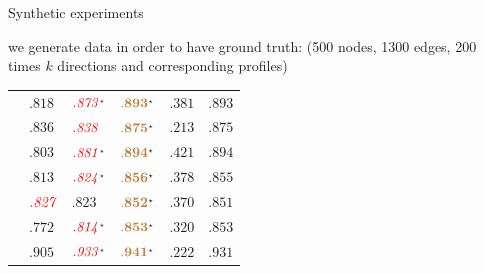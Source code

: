 \documentclass[10pt,svgnames,ignorenonframetext,final]{beamer}
\providecommand{\tightlist}{%
  \setlength{\itemsep}{0pt}\setlength{\parskip}{0pt}}
\begin{document}
\begin{frame}{Synthetic experiments}
\protect\hypertarget{synthetic-experiments}{}

  we generate data in order to have ground truth: (500 nodes, 1300 edges, 200 times $k$ directions
  and corresponding profiles)

  \begin{tabulary}{\textwidth}{llll|ll}
    \toprule
     & \thead{\kmeans{}} & \thead{\lloyd{}}                      &
    \thead{\combined{}}                  &  & \thead{\pqt{}} \\
    \midrule
    {}            & $.818 $           & $\esecondSig{.873 }\spval{1.25}{-63}$ & $\efirstSig{.893 }\spval{5.68}{-33}$ & $.381 $                      & $.893 $        \\
    {\smallk{}}             & $.836 $           & $\esecond{.838 }$                     & $\efirstSig{.875 }\spval{2.17}{-58}$ & $.213 $                      & $.875 $        \\
    {\largek{}}             & $.803 $           & $\esecondSig{.881 }\spval{2.66}{-94}$ & $\efirstSig{.894 }\spval{8.98}{-17}$ & $.421 $                      & $.894 $        \\
    {\smallo{}}             & $.813 $           & $\esecondSig{.824 }\spval{7.57}{-6}$  & $\efirstSig{.856 }\spval{2.99}{-57}$ & $.378 $                      & $.855 $        \\
    {\largeo{}}             & $\esecond{.827 }$ & $.823 $                               & $\efirstSig{.852 }\spval{1.90}{-25}$ & $.370 $                      & $.851 $        \\
    {\fdirs{}}              & $.772 $           & $\esecondSig{.814 }\spval{6.02}{-42}$ & $\efirstSig{.853 }\spval{2.13}{-47}$ & $.320 $                      & $.853 $        \\
    {\larged{}}             & $.905 $           & $\esecondSig{.933 }\spval{1.32}{-31}$ & $\efirstSig{.941 }\spval{1.77}{-22}$ & $.222 $                      & $.931 $        \\
    \bottomrule
  \end{tabulary}

\end{frame}
\end{document}
